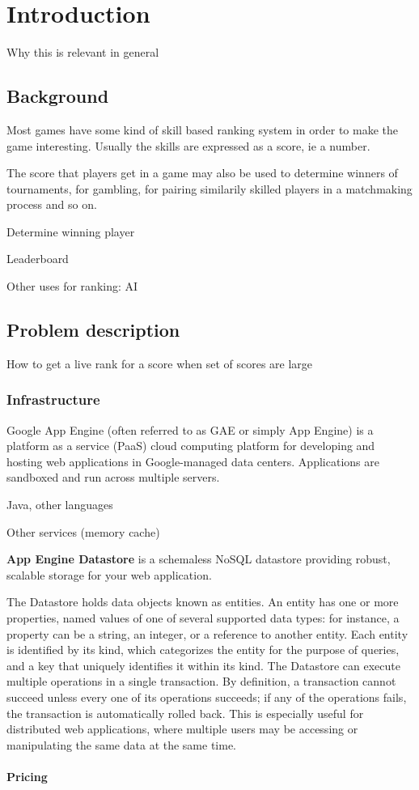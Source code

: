 \chapter{Introduction}

Why this is relevant in general

\section{Background}

Most games have some kind of skill based ranking system in order to make the game interesting. Usually the skills are expressed as a score, ie a number.

The score that players get in a game may also be used to determine winners of tournaments, for gambling, for pairing similarily skilled players in a matchmaking process and so on.

Determine winning player

Leaderboard

Other uses for ranking: AI

\section{Problem description}

\begin{shaded} How to get a live rank for a score when set of scores are large \end{shaded}

\subsection{Infrastructure}

Google App Engine (often referred to as GAE or simply App Engine) is a platform as a service (PaaS) cloud computing platform for developing and hosting web applications in Google-managed data centers. Applications are sandboxed and run across multiple servers.

Java, other languages
 
Other services (memory cache)

\textbf{App Engine Datastore} is a schemaless NoSQL datastore providing robust, scalable storage for your web application.

The Datastore holds data objects known as entities. An entity has one or more properties, named values of one of several supported data types: for instance, a property can be a string, an integer, or a reference to another entity. Each entity is identified by its kind, which categorizes the entity for the purpose of queries, and a key that uniquely identifies it within its kind. The Datastore can execute multiple operations in a single transaction. By definition, a transaction cannot succeed unless every one of its operations succeeds; if any of the operations fails, the transaction is automatically rolled back. This is especially useful for distributed web applications, where multiple users may be accessing or manipulating the same data at the same time.

\subsubsection{Pricing}
